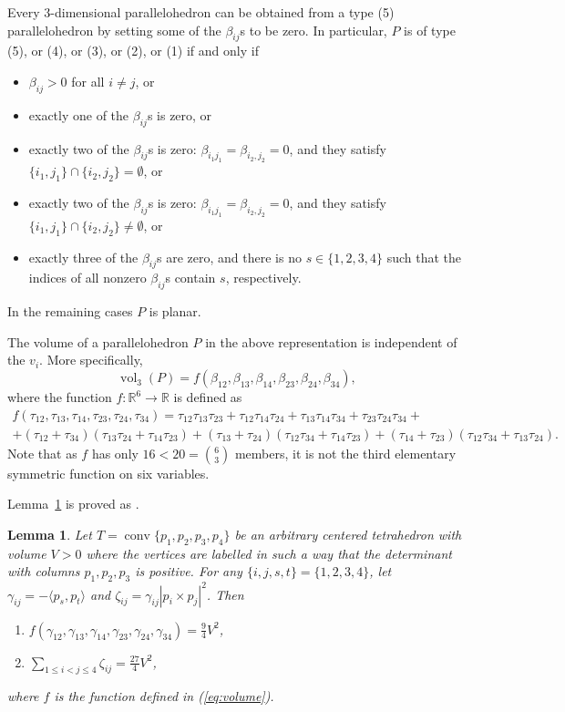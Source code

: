 \documentclass[twoside]{amsart}
\newtheorem{lem}{Lemma}
\theoremstyle{definition}
\renewcommand{\Re}{\mathbb R}
\DeclareMathOperator{\conv}{conv}
\DeclareMathOperator{\vol}{vol}
\begin{document}
Every $3$-dimensional parallelohedron can be obtained from a type (5) parallelohedron by setting some of the $\beta_{ij}$s to be zero. In particular, $P$ is of type (5), or (4), or (3), or (2), or (1) if and only if
\begin{itemize}
\item $\beta_{ij} > 0$ for all $i \neq j$, or
\item exactly one of the $\beta_{ij}$s is zero, or
\item exactly two of the $\beta_{ij}$s is zero: $\beta_{i_1j_1} = \beta_{i_2,j_2} = 0$, and they satisfy $\{ i_1, j_1 \} \cap \{ i_2, j_2 \} = \emptyset$, or
\item exactly two of the $\beta_{ij}$s is zero: $\beta_{i_1j_1} = \beta_{i_2,j_2} = 0$, and they satisfy $\{ i_1, j_1 \} \cap \{ i_2, j_2 \} \neq \emptyset$, or
\item exactly three of the $\beta_{ij}$s are zero, and there is no $s \in \{1,2,3,4\}$ such that the indices of all nonzero $\beta_{ij}$s contain $s$, respectively.
\end{itemize}
In the remaining cases $P$ is planar.

The volume of a parallelohedron $P$ in the above representation is independent of the $v_i$. More specifically,
\begin{equation}\label{eq:vol_rep}
\vol_3(P)= f(\beta_{12},\beta_{13},\beta_{14},\beta_{23},\beta_{24},\beta_{34}),
\end{equation}
where the function $f : \Re^6 \to \Re$ is defined as
\begin{multline}\label{eq:volume}
f(\tau_{12},\tau_{13},\tau_{14},\tau_{23},\tau_{24},\tau_{34}) = \tau_{12} \tau_{13} \tau_{23} + \tau_{12}\tau_{14}\tau_{24} + \tau_{13}\tau_{14}\tau_{34} + \tau_{23} \tau_{24} \tau_{34} +\\
+ (\tau_{12}+\tau_{34})(\tau_{13}\tau_{24}+\tau_{14}\tau_{23})+ (\tau_{13}+\tau_{24})(\tau_{12}\tau_{34}+\tau_{14}\tau_{23}) + (\tau_{14}+\tau_{23})(\tau_{12}\tau_{34}+\tau_{13}\tau_{24}).
\end{multline}
Note that as $f$ has only $16 < 20 = \binom{6}{3}$ members, it is not the third elementary symmetric function on six variables.

Lemma~\ref{lem:tetrahedron_identities} is proved as \cite[Lemma 4]{Langi}.

\begin{lem}\label{lem:tetrahedron_identities}
Let $T=\conv \{ p_1,p_2,p_3,p_4\}$ be an arbitrary centered tetrahedron with volume $V>0$ where the vertices are labelled in such a way that the determinant with columns $p_1,p_2,p_3$ is positive.
For any $\{i,j,s,t\} = \{1,2,3,4\}$, let $\gamma_{ij}=- \langle p_s, p_t \rangle$
and $\zeta_{ij}= \gamma_{ij} | p_i \times p_j|^2$. Then
\begin{enumerate}
\item $f(\gamma_{12},\gamma_{13},\gamma_{14},\gamma_{23},\gamma_{24},\gamma_{34}) = \frac{9}{4}V^2$,
\item $\sum_{1 \leq  i < j \leq 4} \zeta_{ij} = \frac{27}{4}V^2$,
\end{enumerate}
where $f$ is the function defined in (\ref{eq:volume}).
\end{lem}
 
\end{document}

